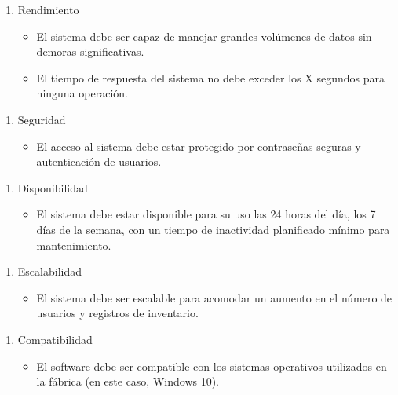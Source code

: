 \documentclass{article}
\begin{document}
\begin{enumerate}[start=2]
	\item Rendimiento
	\begin{itemize}
		\item El sistema debe ser capaz de manejar grandes volúmenes de datos sin demoras significativas.
		\item El tiempo de respuesta del sistema no debe exceder los X segundos para ninguna operación.
	\end{itemize}
\end{enumerate}

\clearpage
\begin{enumerate}[start=3]
	\item Seguridad
	\begin{itemize}
		\item El acceso al sistema debe estar protegido por contraseñas seguras y autenticación de usuarios.
	\end{itemize}
\end{enumerate}

\begin{enumerate}[start=4]
	\item Disponibilidad
	\begin{itemize}
		\item El sistema debe estar disponible para su uso las 24 horas del día, los 7 días de la semana, con un tiempo de inactividad planificado mínimo para mantenimiento.
	\end{itemize}
\end{enumerate}

\begin{enumerate}[start=5]
	\item Escalabilidad
	\begin{itemize}
		\item El sistema debe ser escalable para acomodar un aumento en el número de usuarios y registros de inventario.
	\end{itemize}
\end{enumerate}

\begin{enumerate}[start=6]
	\item Compatibilidad
	\begin{itemize}
		\item El software debe ser compatible con los sistemas operativos utilizados en la fábrica (en este caso, Windows 10).
	\end{itemize}
\end{enumerate}
\end{document}
